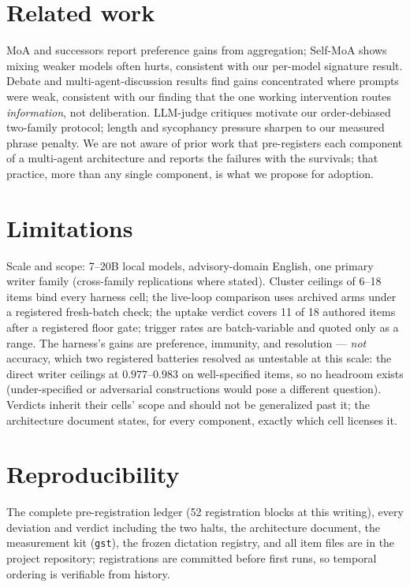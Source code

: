\documentclass[11pt]{article}
\begin{document}
\section{Related work}
\label{sec:related}

MoA \cite{wang2024moa} and successors report preference gains from
aggregation; Self-MoA \cite{li2025selfmoa} shows mixing weaker models
often hurts, consistent with our per-model signature result. Debate
and multi-agent-discussion results \cite{wang2024rebuttal} find gains
concentrated where prompts were weak, consistent with our finding that
the one working intervention routes \emph{information}, not
deliberation. LLM-judge critiques \cite{zheng2023judging} motivate our
order-debiased two-family protocol; length and sycophancy pressure
\cite{singhal2023length,sharma2023sycophancy} sharpen to our measured
phrase penalty. We are not aware of prior work that pre-registers each
component of a multi-agent architecture and reports the failures with
the survivals; that practice, more than any single component, is what
we propose for adoption.

\section{Limitations}
\label{sec:limits}

Scale and scope: 7--20B local models, advisory-domain English, one
primary writer family (cross-family replications where stated).
Cluster ceilings of 6--18 items bind every harness cell; the live-loop
comparison uses archived arms under a registered fresh-batch check;
the uptake verdict covers 11 of 18 authored items after a registered
floor gate; trigger rates are batch-variable and quoted only as a
range. The harness's gains are preference, immunity, and resolution
--- \emph{not} accuracy, which two registered batteries resolved as
untestable at this scale: the direct writer ceilings at $0.977$--$0.983$
on well-specified items, so no headroom exists (under-specified or
adversarial constructions would pose a different question). Verdicts inherit their cells' scope and should
not be generalized past it; the architecture document states, for
every component, exactly which cell licenses it.

\section{Reproducibility}

The complete pre-registration ledger (52 registration blocks at this
writing), every deviation and verdict including the two halts, the
architecture document, the measurement kit (\texttt{gst}), the frozen
dictation registry, and all item files are in the project repository;
registrations are committed before first runs, so temporal ordering is
verifiable from history.
\end{document}
